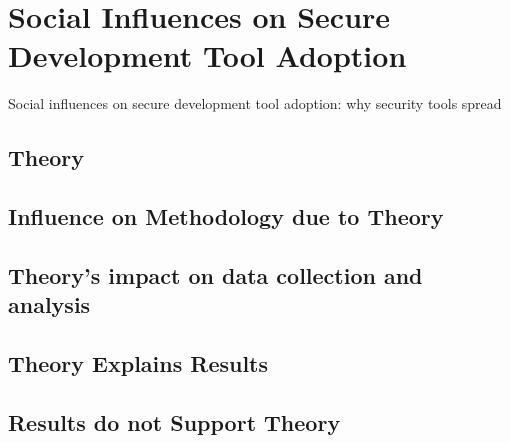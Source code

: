 \documentclass[12pt]{IEEEtran}
\begin{document}

\section{Social Influences on Secure Development Tool Adoption}

Social influences on secure development tool adoption: why security tools spread\cite{xiao2014social}

\subsection{Theory}

\subsection{Influence on Methodology due to Theory}

\subsection{Theory's impact on data collection and analysis}

\subsection{Theory Explains Results}
\subsection{Results do not Support Theory} %



\end{document}
